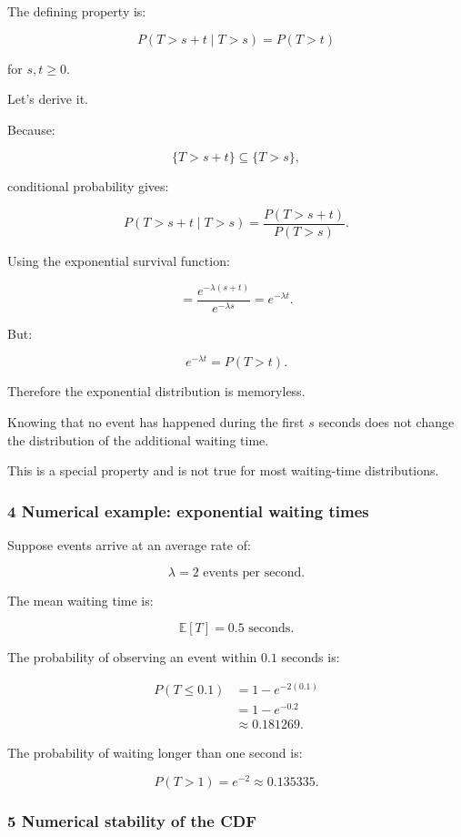 The defining property is:

\[
 \boxed{ P(T>s+t\mid T>s)=P(T>t) }
\]

for \(s,t\ge0\).

Let's derive it.

Because:

\[
 \{T>s+t\}\subseteq\{T>s\},
\]

conditional probability gives:

\[
 P(T>s+t\mid T>s) = \frac{P(T>s+t)}{P(T>s)}.
\]

Using the exponential survival function:

\[
 = \frac{e^{-\lambda(s+t)}}{e^{-\lambda s}} =e^{-\lambda t}.
\]

But:

\[
 e^{-\lambda t}=P(T>t).
\]

Therefore the exponential distribution is memoryless.

Knowing that no event has happened during the first \(s\) seconds does not change the distribution of the additional waiting time.

This is a special property and is not true for most waiting-time distributions.

\subsubsection{4 Numerical example: exponential waiting times}\label{02-foundations-ii-ch024-numerical-example-exponential-waiting-times}

Suppose events arrive at an average rate of:

\[
 \lambda=2\text{ events per second}.
\]

The mean waiting time is:

\[
 \mathbb E[T]=0.5\text{ seconds}.
\]

The probability of observing an event within \(0.1\) seconds is:

\[
 \begin{aligned} P(T\le0.1) &=1-e^{-2(0.1)}\\ &=1-e^{-0.2}\\ &\approx\boxed{0.181269}. \end{aligned}
\]

The probability of waiting longer than one second is:

\[
 P(T>1)=e^{-2}\approx0.135335.
\]

\subsubsection{5 Numerical stability of the CDF}\label{02-foundations-ii-ch024-numerical-stability-of-the-cdf}

